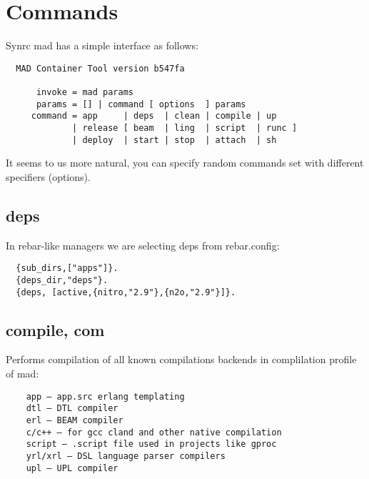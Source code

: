 \section{Commands}

Synrc mad has a simple interface as follows:

\vspace{1\baselineskip}
\begin{lstlisting}
  MAD Container Tool version b547fa

      invoke = mad params
      params = [] | command [ options  ] params
     command = app     | deps  | clean | compile | up
             | release [ beam  | ling  | script  | runc ]
             | deploy  | start | stop  | attach  | sh
\end{lstlisting}
\vspace{1\baselineskip}

It seems to us more natural, you can specify random
commands set with different specifiers (options).

\subsection{deps}

In rebar-like managers we are selecting deps from rebar.config:
\vspace{1\baselineskip}
\begin{lstlisting}
  {sub_dirs,["apps"]}.
  {deps_dir,"deps"}.
  {deps, [active,{nitro,"2.9"},{n2o,"2.9"}]}.
\end{lstlisting}
\vspace{1\baselineskip}


\subsection{compile, com}
Performs compilation of all known compilations backends in complilation profile of mad:
\vspace{1\baselineskip}
\begin{lstlisting}
    app — app.src erlang templating
    dtl — DTL compiler
    erl — BEAM compiler
    c/c++ — for gcc cland and other native compilation
    script — .script file used in projects like gproc
    yrl/xrl — DSL language parser compilers
    upl — UPL compiler
\end{lstlisting}
\vspace{1\baselineskip}

